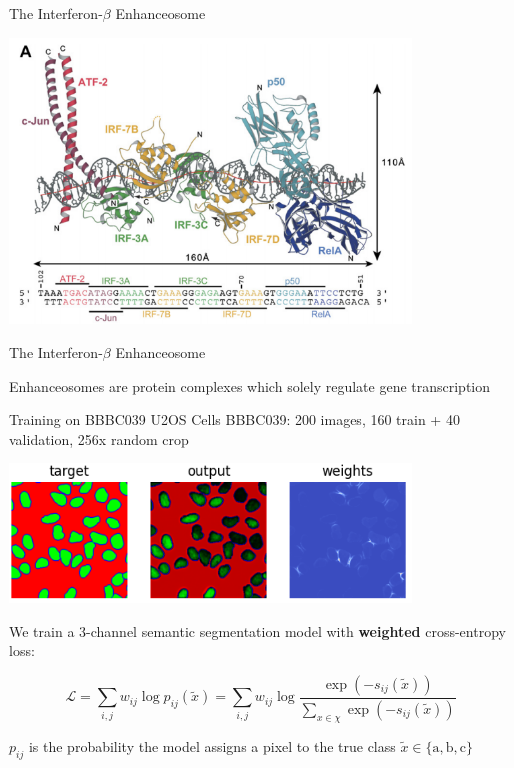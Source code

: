 \documentclass[aspectratio=1610]{beamer}					%
\begin{document}
\begin{frame}{The Interferon-$\beta$ Enhanceosome}

\begin{center}
\includegraphics[width=0.8\textwidth]{enhance.png}
\end{center}

\end{frame}

\begin{frame}{The Interferon-$\beta$ Enhanceosome}

Enhanceosomes are protein complexes which solely regulate gene transcription

\end{frame}

\begin{frame}{Training on BBBC039 U2OS Cells}
\vspace{0.1in}
BBBC039: 200 images, 160 train + 40 validation, 256\;x random crop

\begin{center}
\includegraphics[width=0.8\textwidth]{weights.png}
\end{center}

We train a 3-channel semantic segmentation model with \textbf{weighted} cross-entropy loss:

\begin{equation*}
\mathcal{L} = \sum_{i,j} w_{ij}\log p_{ij}(\tilde{x}) = \sum_{i,j} w_{ij}\log \frac{\exp(-s_{ij}(\tilde{x}))}{\sum_{x\in\chi} \exp(-s_{ij}(\tilde{x}))}
\end{equation*}

$p_{ij}$ is the probability the model assigns a pixel to the true class $\tilde{x} \in \{\textrm{a}, \textrm{b}, \textrm{c}\}$

\end{frame}
\end{document}
